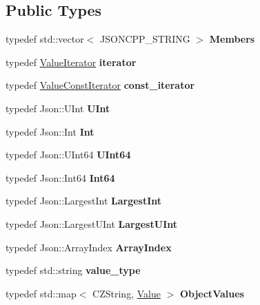 \subsection*{Public Types}
\begin{DoxyCompactItemize}
\item 
\mbox{\label{classJson_1_1Value_a9ae9069983fc38f1928d76f9c79ac64d}} 
typedef std\+::vector$<$ J\+S\+O\+N\+C\+P\+P\+\_\+\+S\+T\+R\+I\+NG $>$ {\bfseries Members}
\item 
\mbox{\label{classJson_1_1Value_a341cdf2e01f8b3c5b7317aa2f0768c53}} 
typedef \hyperlink{classJson_1_1ValueIterator}{Value\+Iterator} {\bfseries iterator}
\item 
\mbox{\label{classJson_1_1Value_af92282ca92b58b320debd486afb7696a}} 
typedef \hyperlink{classJson_1_1ValueConstIterator}{Value\+Const\+Iterator} {\bfseries const\+\_\+iterator}
\item 
\mbox{\label{classJson_1_1Value_a0933d59b45793ae4aade1757c322a98d}} 
typedef Json\+::\+U\+Int {\bfseries U\+Int}
\item 
\mbox{\label{classJson_1_1Value_abdf7a7ff73eb130ffcab28504ffdb405}} 
typedef Json\+::\+Int {\bfseries Int}
\item 
\mbox{\label{classJson_1_1Value_a8b62564be8c087c6d18de180ff4e13e3}} 
typedef Json\+::\+U\+Int64 {\bfseries U\+Int64}
\item 
\mbox{\label{classJson_1_1Value_a1b86af9f85f0f1baa972c3319fa22695}} 
typedef Json\+::\+Int64 {\bfseries Int64}
\item 
\mbox{\label{classJson_1_1Value_a1cbb82642ed05109b9833e49f042ece7}} 
typedef Json\+::\+Largest\+Int {\bfseries Largest\+Int}
\item 
\mbox{\label{classJson_1_1Value_a6682a3684d635e03fc06ba229fa24eec}} 
typedef Json\+::\+Largest\+U\+Int {\bfseries Largest\+U\+Int}
\item 
\mbox{\label{classJson_1_1Value_a184a91566cccca7b819240f0d5561c7d}} 
typedef Json\+::\+Array\+Index {\bfseries Array\+Index}
\item 
\mbox{\label{classJson_1_1Value_a9e071ef3c135a2c9602e893b6005d0f7}} 
typedef std\+::string {\bfseries value\+\_\+type}
\item 
\mbox{\label{classJson_1_1Value_a08b6c80c3af7071d908dabf044de5388}} 
typedef std\+::map$<$ C\+Z\+String, \hyperlink{classJson_1_1Value}{Value} $>$ {\bfseries Object\+Values}
\end{DoxyCompactItemize}

